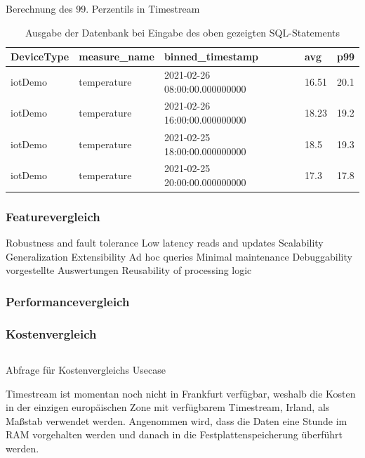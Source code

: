 \begin{listing}[H]
\inputminted[frame=lines,breaklines=true]{sql}{code/timestream-example.sql}
\caption{Berechnung des 99. Perzentils in Timestream}
\label{lst:sql-timestream}
\end{listing}

\begin{table}[H]
\centering
\begin{tabular}{|l|l|l|l|l|}
\hline
DeviceType & measure\_name & binned\_timestamp & avg & p99 \\ \hline
iotDemo & temperature & 2021-02-26 08:00:00.000000000 & 16.51 & 20.1 \\ \hline
iotDemo & temperature & 2021-02-26 16:00:00.000000000 & 18.23 & 19.2 \\ \hline
iotDemo & temperature & 2021-02-25 18:00:00.000000000 & 18.5 & 19.3 \\ \hline
iotDemo & temperature & 2021-02-25 20:00:00.000000000 & 17.3 & 17.8 \\ \hline
\end{tabular}
\caption{Ausgabe der Datenbank bei Eingabe des oben gezeigten SQL-Statements}
\label{tab:AusgabeSQL}
\end{table}
\subsubsection{Featurevergleich} 
Robustness and fault tolerance
Low latency reads and updates
Scalability
Generalization
Extensibility
Ad hoc queries
Minimal maintenance
Debuggability
vorgestellte Auswertungen 
Reusability of processing logic

\subsubsection{Performancevergleich}

\subsubsection{Kostenvergleich}
\begin{listing}[H]
\inputminted[frame=lines,breaklines=true]{sql}{code/timestream-threshold.sql}
\caption{Abfrage für Kostenvergleichs Usecase}
\label{listing:timestream-kostenvergleich}
\end{listing}

Timestream ist momentan noch nicht in Frankfurt verfügbar, weshalb die Kosten in der einzigen europäischen Zone mit verfügbarem Timestream, Irland, als Maßstab verwendet werden. Angenommen wird, dass die Daten eine Stunde im \ac{RAM} vorgehalten werden und danach in die Festplattenspeicherung überführt werden.

